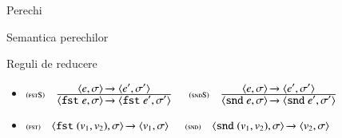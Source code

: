 \documentclass[xcolor=pdftex,romanian,colorlinks]{beamer}
\begin{document}
\begin{section}{Perechi}
\begin{frame}{Semantica perechilor}
\begin{block}{Reguli de reducere}
\begin{itemize}
\item[] $\reg[fstS]{\Ss{\c{\terminal{fst} e,\sigma}}{\c{\terminal{fst} e',\sigma'}}}{\Ss{\c{e,\sigma}}{\c{e',\sigma'}}}{}$
\hfill $\reg[sndS]{\Ss{\c{\terminal{snd} e,\sigma}}{\c{\terminal{snd} e',\sigma'}}}{\Ss{\c{e,\sigma}}{\c{e',\sigma'}}}{}$

\item[] $\reg[fst]{\Ss{\c{\terminal{fst} (v_1,v_2),\sigma}}{\c{v_1,\sigma}}}{}{}$ 
\hfill $\reg[snd]{\Ss{\c{\terminal{snd} (v_1,v_2),\sigma}}{\c{v_2,\sigma}}}{}{}$ 

\end{itemize}
\end{block}
\end{frame}

\end{section}
\end{document}

